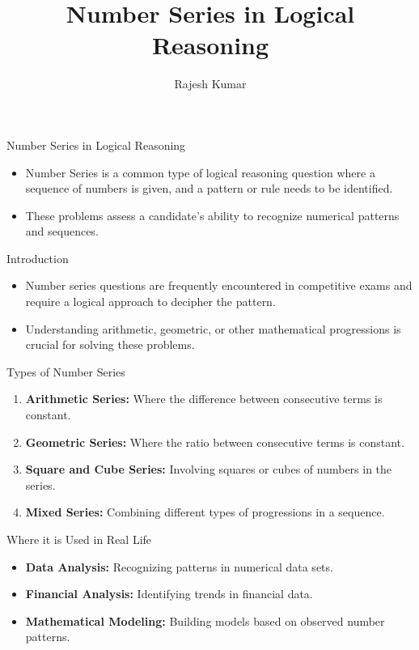 \title{Number Series in Logical Reasoning}
\author{Rajesh Kumar}
\date{}

\begin{frame}
  \titlepage
\end{frame}

\begin{frame}{Number Series in Logical Reasoning}
  \begin{itemize}
    \item Number Series is a common type of logical reasoning question where a sequence of numbers is given, and a pattern or rule needs to be identified.
    \item These problems assess a candidate's ability to recognize numerical patterns and sequences.
  \end{itemize}
\end{frame}

\begin{frame}{Introduction}
  \begin{itemize}
    \item Number series questions are frequently encountered in competitive exams and require a logical approach to decipher the pattern.
    \item Understanding arithmetic, geometric, or other mathematical progressions is crucial for solving these problems.
  \end{itemize}
\end{frame}

\begin{frame}{Types of Number Series}
  \begin{enumerate}
    \item \textbf{Arithmetic Series:} Where the difference between consecutive terms is constant.
    \item \textbf{Geometric Series:} Where the ratio between consecutive terms is constant.
    \item \textbf{Square and Cube Series:} Involving squares or cubes of numbers in the series.
    \item \textbf{Mixed Series:} Combining different types of progressions in a sequence.
  \end{enumerate}
\end{frame}

\begin{frame}{Where it is Used in Real Life}
  \begin{itemize}
    \item \textbf{Data Analysis:} Recognizing patterns in numerical data sets.
    \item \textbf{Financial Analysis:} Identifying trends in financial data.
    \item \textbf{Mathematical Modeling:} Building models based on observed number patterns.
  \end{itemize}
\end{frame}

